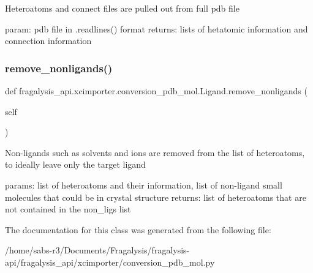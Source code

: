 \begin{DoxyVerb}Heteroatoms and connect files are pulled out from full pdb file

param: pdb file in .readlines() format
returns: lists of hetatomic information and connection information
\end{DoxyVerb}
 \mbox{\label{classfragalysis__api_1_1xcimporter_1_1conversion__pdb__mol_1_1_ligand_af21865a4bb9be6aab21bfc82668ba25e}} 
\subsubsection{\texorpdfstring{remove\+\_\+nonligands()}{remove\_nonligands()}}
{\footnotesize\ttfamily def fragalysis\+\_\+api.\+xcimporter.\+conversion\+\_\+pdb\+\_\+mol.\+Ligand.\+remove\+\_\+nonligands (\begin{DoxyParamCaption}\item[{}]{self }\end{DoxyParamCaption})}

\begin{DoxyVerb}Non-ligands such as solvents and ions are removed from the list of heteroatoms,
to ideally leave only the target ligand

params: list of heteroatoms and their information, list of non-ligand small molecules
    that could be in crystal structure
returns: list of heteroatoms that are not contained in the non_ligs list
\end{DoxyVerb}
 

The documentation for this class was generated from the following file\+:\begin{DoxyCompactItemize}
\item 
/home/sabs-\/r3/\+Documents/\+Fragalysis/fragalysis-\/api/fragalysis\+\_\+api/xcimporter/conversion\+\_\+pdb\+\_\+mol.\+py\end{DoxyCompactItemize}
